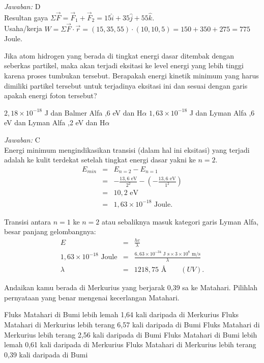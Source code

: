\documentclass[11pt,fleqn]{exam}
\begin{document}
\begin{questions}
\textit{Jawaban: } D\\
Resultan gaya $\Sigma\overrightarrow{F}=\overrightarrow{F}_1+\overrightarrow{F}_2=15\hat{i}+35\hat{j}+55\hat{k}$.\\
Usaha/kerja $W=\Sigma\overrightarrow{F}\cdot\overrightarrow{r}=(15, 35, 55)\cdot(10, 10, 5)= 150 + 350 + 275 = 775$ Joule.

\question Jika atom hidrogen yang berada di tingkat energi dasar ditembak dengan seberkas partikel, maka akan terjadi eksitasi ke level energi yang lebih tinggi karena proses tumbukan tersebut. Berapakah energi kinetik minimum yang harus dimiliki partikel tersebut untuk terjadinya eksitasi ini dan sesuai dengan garis apakah energi foton tersebut?
\begin{choices}
	\choice $2,18 \times 10^{-18}$ J dan Balmer Alfa
	,6 eV dan H$\alpha$ 
	\choice $1,63 \times 10^{-18}$ J dan Lyman Alfa
	,6 eV dan Lyman Alfa
	,2 eV dan H$\alpha$
\end{choices}

\textit{Jawaban: } C\\
Energi minimum mengindikasikan transisi (dalam hal ini eksitasi) yang terjadi adalah ke kulit terdekat setelah tingkat energi dasar yakni ke $n=2$.
\begin{eqnarray*}
E_{min}&=&E_{n=2}-E_{n=1}\\
&=&-\frac{13,6 \text{ eV}}{2^2}-\left(-\frac{13,6 \text{ eV}}{1^2}\right)\\
&=&10,2\text{ eV}\\
&=&1,63\times 10^{-18}\text{ Joule}.
\end{eqnarray*}

Transisi antara $n=1$ ke $n=2$ atau sebaliknya masuk kategori garis Lyman Alfa, besar panjang gelombangnya:
\begin{eqnarray*}
E &=&\frac{hc}{\lambda}\\
1,63\times 10^{-18}\text{ Joule}&=&\frac{6,63\times 10^{-34}\text{ J s}\times 3\times 10^8\text{ m/s}}{\lambda}\\
\lambda&=&1218,75\text{ \AA} \qquad (UV).
\end{eqnarray*}

\question Andaikan kamu berada di Merkurius yang berjarak 0,39 sa ke Matahari. Pilihlah pernyataan yang benar mengenai kecerlangan Matahari.
\begin{choices}
\choice Fluks Matahari di Bumi lebih lemah 1,64 kali daripada di Merkurius
\choice Fluks Matahari di Merkurius lebih terang 6,57 kali daripada di Bumi
\choice Fluks Matahari di Merkurius lebih terang 2,56 kali daripada di Bumi
\choice Fluks Matahari di Bumi lebih lemah 0,61 kali daripada di Merkurius
\choice Fluks Matahari di Merkurius lebih terang 0,39 kali daripada di Bumi
\end{choices}


\end{questions}
\end{document}
